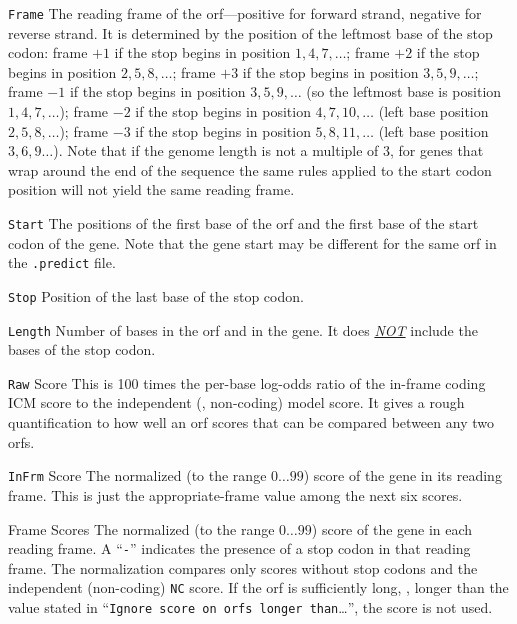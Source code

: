 \documentclass[fleqn,titlepage,11pt]{article}
\def\Pg#1{\texttt{#1}}
\begin{document}
\item[\Pg{Frame}]
  The reading frame of the orf---positive for forward strand, negative for reverse strand.
  It is determined by the position of the leftmost base of the stop codon:
  \bn
  \exdent
    frame $+1$ if the stop begins in position $1,4,7,\ldots$;
  \exdent
    frame $+2$ if the stop begins in position $2,5,8,\ldots$; 
  \exdent
    frame $+3$ if the stop begins in position $3,5,9,\ldots$; 
  \exdent
    frame $-1$ if the stop begins in position $3,5,9,\ldots$ (so the leftmost base
    is position $1,4,7,\ldots$);
  \exdent
    frame $-2$ if the stop begins in position $4,7,10,\ldots$ (left base position
    $2,5,8,\ldots$);
  \exdent
    frame $-3$ if the stop begins in position $5,8,11,\ldots$ (left base position
    $3,6,9\ldots$).
  \en
  Note that if the genome length is not a multiple of $3$, for genes that wrap
  around the end of the sequence the same rules applied
  to the start codon position will not yield the same reading frame.

\item[\Pg{Start}]
  The positions of the first base of the orf and the first base of the start codon of the
  gene.  Note that the gene start may be different for the same orf in the \Pg{.predict} file.

\item[\Pg{Stop}]
  Position of the last base of the stop codon.

\item[\Pg{Length}]
  Number of bases in the orf and in the gene.  It does \underline{\emph{NOT}}
  include the bases of the stop codon.

\item[\Pg{Raw} Score]
  This is 100 times the per-base log-odds ratio of the in-frame coding ICM score to the
  independent (\ie, non-coding) model score.  It gives a rough quantification to how
  well an orf scores that can be compared between any two orfs.
  
\item[\Pg{InFrm} Score]
  The normalized (to the range $ 0\ldots 99$) score of the gene in its
  reading frame.  This is just the appropriate-frame value among the next
  six scores.

\item[Frame Scores]
  The normalized (to the range $ 0\ldots 99$) score of the gene in each reading frame.
  A ``\Pg{-}'' indicates the presence of a stop codon in that reading frame.
  The normalization compares only scores without stop codons and the independent
  (non-coding) \Pg{NC} score.  If the orf is sufficiently long, \ie, longer than
  the value stated in ``\Pg{Ignore score on orfs longer than}\ldots'',
  the score is not used.
\end{document}
